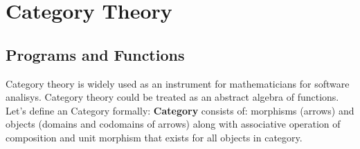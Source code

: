 \documentclass[11pt,oneside]{article}
\begin{document}
\section{Category Theory}
\vspace{0.3cm}

   \subsection{Programs and Functions}
   Category theory is widely used as an instrument for mathematicians for software analisys.
   Category theory could be treated as an abstract algebra of functions. Let's define an Category
   formally: {\bf Category} consists of: morphisms (arrows) and objects (domains and codomains of arrows)
   along with associative operation of composition and unit morphism that exists for all objects in category.


\end{document}
